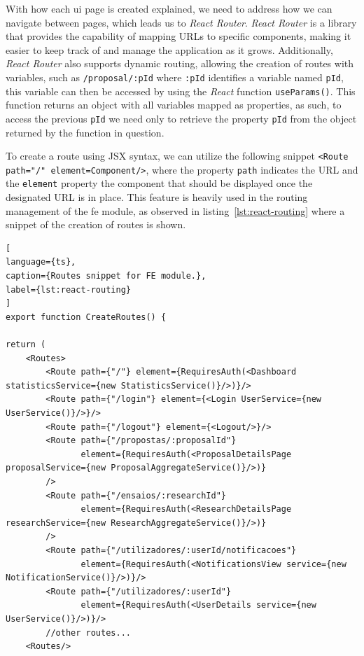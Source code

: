 With how each \acrshort{ui} page is created explained, we need to address how we can navigate between pages, which leads us to \textit{React Router}. \textit{React Router} is a library that provides the capability of mapping URLs to specific components, making it easier to keep track of and manage the application as it grows. Additionally, \textit{React Router} also supports dynamic routing, allowing the creation of routes with variables, such as \lstinline{/proposal/:pId} where \lstinline{:pId} identifies a variable named \lstinline{pId}, this variable can then be accessed by using the \textit{React} function \lstinline{useParams()}. This function returns an object with all variables mapped as properties, as such, to access the previous \lstinline{pId} we need only to retrieve the property \lstinline{pId} from the object returned by the function in question.

To create a route using JSX syntax, we can utilize the following snippet \lstinline{<Route path="/" element=Component/>}, where the property \lstinline{path} indicates the URL and the \lstinline{element} property the component that should be displayed once the designated URL is in place.
This feature is heavily used in the routing management of the \acrshort{fe} module, as observed in listing~\ref{lst:react-routing} where a snippet of the creation of routes is shown. 

\begin{lstlisting}[
language={ts},
caption={Routes snippet for FE module.},
label={lst:react-routing}
]
export function CreateRoutes() {

return (
    <Routes>
        <Route path={"/"} element={RequiresAuth(<Dashboard statisticsService={new StatisticsService()}/>)}/>
        <Route path={"/login"} element={<Login UserService={new UserService()}/>}/>
        <Route path={"/logout"} element={<Logout/>}/>
        <Route path={"/propostas/:proposalId"}
               element={RequiresAuth(<ProposalDetailsPage proposalService={new ProposalAggregateService()}/>)}
        />
        <Route path={"/ensaios/:researchId"}
               element={RequiresAuth(<ResearchDetailsPage researchService={new ResearchAggregateService()}/>)}
        />
        <Route path={"/utilizadores/:userId/notificacoes"}
               element={RequiresAuth(<NotificationsView service={new NotificationService()}/>)}/>
        <Route path={"/utilizadores/:userId"}
               element={RequiresAuth(<UserDetails service={new UserService()}/>)}/>
        //other routes...
    <Routes/>
\end{lstlisting}

